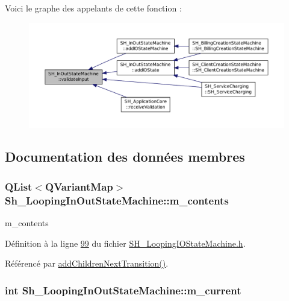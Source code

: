 Voici le graphe des appelants de cette fonction \-:\nopagebreak
\begin{figure}[H]
\begin{center}
\leavevmode
\includegraphics[width=350pt]{classSH__InOutStateMachine_aec1b3fef3c1f82499aa1f73beaecd08a_icgraph}
\end{center}
\end{figure}




\subsection{Documentation des données membres}
\hypertarget{classSh__LoopingInOutStateMachine_a267e7cbcb3d6a137e2a4e1f93fb57e68}{
\subsubsection[{m\-\_\-contents}]{\setlength{\rightskip}{0pt plus 5cm}Q\-List$<$Q\-Variant\-Map$>$ Sh\-\_\-\-Looping\-In\-Out\-State\-Machine\-::m\-\_\-contents\hspace{0.3cm}{\ttfamily [private]}}}\label{classSh__LoopingInOutStateMachine_a267e7cbcb3d6a137e2a4e1f93fb57e68}


m\-\_\-contents 



Définition à la ligne \hyperlink{SH__LoopingIOStateMachine_8h_source_l00099}{99} du fichier \hyperlink{SH__LoopingIOStateMachine_8h_source}{S\-H\-\_\-\-Looping\-I\-O\-State\-Machine.\-h}.



Référencé par \hyperlink{classSh__LoopingInOutStateMachine_a20d5e4d9feea63bea747b45b7c10ca01}{add\-Children\-Next\-Transition()}.

\hypertarget{classSh__LoopingInOutStateMachine_a6bcf7bcfe684dbd4d11ed327948e161b}{
\subsubsection[{m\-\_\-current}]{\setlength{\rightskip}{0pt plus 5cm}int Sh\-\_\-\-Looping\-In\-Out\-State\-Machine\-::m\-\_\-current\hspace{0.3cm}{\ttfamily [private]}}}\label{classSh__LoopingInOutStateMachine_a6bcf7bcfe684dbd4d11ed327948e161b}


